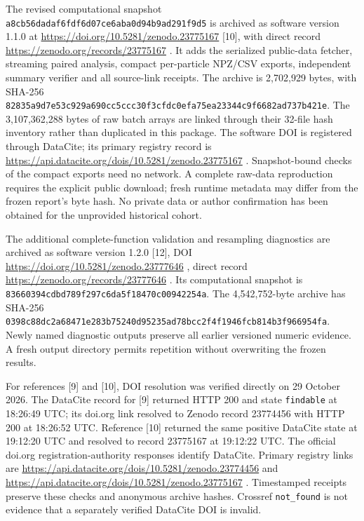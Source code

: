 The revised computational snapshot
\nolinkurl{a8cb56dadaf6fdf6d07ce6aba0d94b9ad291f9d5} is archived as
software version 1.1.0 at \url{https://doi.org/10.5281/zenodo.23775167}
{[}10{]}, with direct record \url{https://zenodo.org/records/23775167} .
It adds the serialized public-data fetcher, streaming paired analysis,
compact per-particle NPZ/CSV exports, independent summary verifier and
all source-link receipts. The archive is 2,702,929 bytes, with SHA-256
\nolinkurl{82835a9d7e53c929a690cc5ccc30f3cfdc0efa75ea23344c9f6682ad737b421e}.
The 3,107,362,288 bytes of raw batch arrays are linked through their
32-file hash inventory rather than duplicated in this package. The
software DOI is registered through DataCite; its primary registry record
is \url{https://api.datacite.org/dois/10.5281/zenodo.23775167} .
Snapshot-bound checks of the compact exports need no network. A complete
raw-data reproduction requires the explicit public download; fresh
runtime metadata may differ from the frozen report's byte hash. No
private data or author confirmation has been obtained for the unprovided
historical cohort.

The additional complete-function validation and resampling diagnostics
are archived as software version 1.2.0 {[}12{]}, DOI
\url{https://doi.org/10.5281/zenodo.23777646} , direct record
\url{https://zenodo.org/records/23777646} . Its computational snapshot
is \nolinkurl{83660394cdbd789f297c6da5f18470c00942254a}. The 4,542,752-byte
archive has SHA-256
\nolinkurl{0398c88dc2a68471e283b75240d95235ad78bcc2f4f1946fcb814b3f966954fa}.
Newly named diagnostic outputs preserve all earlier versioned numeric
evidence. A fresh output directory permits repetition without
overwriting the frozen results.

For references {[}9{]} and {[}10{]}, DOI resolution was verified
directly on 29 October 2026. The DataCite record for {[}9{]} returned
HTTP 200 and state \nolinkurl{findable} at 18:26:49 UTC; its doi.org link
resolved to Zenodo record 23774456 with HTTP 200 at 18:26:52 UTC.
Reference {[}10{]} returned the same positive DataCite state at 19:12:20
UTC and resolved to record 23775167 at 19:12:22 UTC. The official
doi.org registration-authority responses identify DataCite. Primary
registry links are
\url{https://api.datacite.org/dois/10.5281/zenodo.23774456} and
\url{https://api.datacite.org/dois/10.5281/zenodo.23775167} .
Timestamped receipts preserve these checks and anonymous archive hashes.
Crossref \nolinkurl{not_found} is not evidence that a separately verified
DataCite DOI is invalid.

